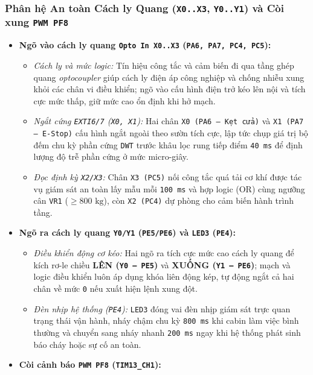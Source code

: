 \subsubsection{Phân hệ An toàn Cách ly Quang (\texttt{X0..X3}, \texttt{Y0..Y1}) và Còi xung \texttt{PWM PF8}}
\begin{itemize}[nosep]
    \item \textbf{Ngõ vào cách ly quang \texttt{Opto In X0..X3} (\texttt{PA6, PA7, PC4, PC5}):}
    \begin{itemize}[nosep]
        \item \textit{Cách ly và mức logic:} Tín hiệu công tắc và cảm biến đi qua tầng ghép quang \textit{optocoupler} giúp cách ly điện áp công nghiệp và chống nhiễu xung khỏi các chân vi điều khiển; ngõ vào cấu hình điện trở kéo lên nội và tích cực mức thấp, giữ mức cao ổn định khi hở mạch.
        \item \textit{Ngắt cứng \texttt{EXTI6/7} (\texttt{X0, X1}):} Hai chân \texttt{X0 (PA6 -- Kẹt cửa)} và \texttt{X1 (PA7 -- E-Stop)} cấu hình ngắt ngoài theo sườn tích cực, lập tức chụp giá trị bộ đếm chu kỳ phần cứng \texttt{DWT} trước khâu lọc rung tiếp điểm \texttt{40~ms} để định lượng độ trễ phần cứng ở mức micro-giây.
        \item \textit{Đọc định kỳ \texttt{X2/X3}:} Chân \texttt{X3 (PC5)} nối công tắc quá tải cơ khí được tác vụ giám sát an toàn lấy mẫu mỗi \texttt{100~ms} và hợp logic (OR) cùng ngưỡng cân \texttt{VR1} ($\ge 800\text{ kg}$), còn \texttt{X2 (PC4)} dự phòng cho cảm biến hành trình tầng.
    \end{itemize}
    \item \textbf{Ngõ ra cách ly quang \texttt{Y0/Y1} (\texttt{PE5/PE6}) và \texttt{LED3} (\texttt{PE4}):}
    \begin{itemize}[nosep]
        \item \textit{Điều khiển động cơ kéo:} Hai ngõ ra tích cực mức cao cách ly quang để kích rơ-le chiều \textbf{LÊN (\texttt{Y0 -- PE5})} và \textbf{XUỐNG (\texttt{Y1 -- PE6})}; mạch và logic điều khiển luôn áp dụng khóa liên động kép, tự động ngắt cả hai chân về mức \texttt{0} nếu xuất hiện lệnh xung đột.
        \item \textit{Đèn nhịp hệ thống (\texttt{PE4}):} \texttt{LED3} đóng vai đèn nhịp giám sát trực quan trạng thái vận hành, nháy chậm chu kỳ \texttt{800~ms} khi cabin làm việc bình thường và chuyển sang nháy nhanh \texttt{200~ms} ngay khi hệ thống phát sinh báo cháy hoặc sự cố an toàn.
    \end{itemize}
    \item \textbf{Còi cảnh báo \texttt{PWM PF8} (\texttt{TIM13\_CH1}):}

\end{itemize}
